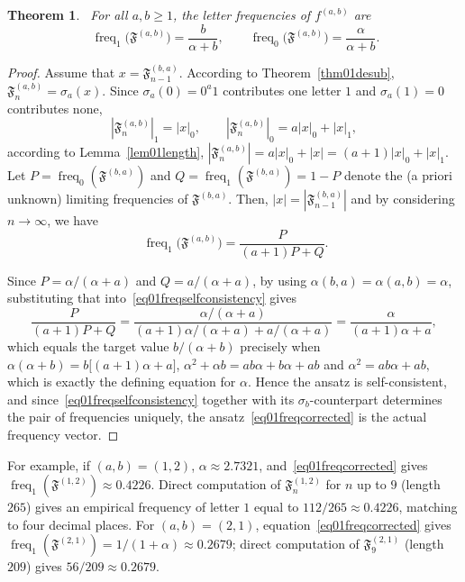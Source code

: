\documentclass[12pt]{amsart}
\theoremstyle{plain}
\newtheorem{theorem}{Theorem}[section]
\theoremstyle{definition}
\theoremstyle{remark}
\newcommand{\FD}{\mathfrak{F}}
\begin{document}
\begin{theorem}~\label{thm02freqduality}
For all $a,b\geqslant 1$, the letter frequencies of $f^{(a,b)}$ are
\begin{equation}~\label{eq01freqcorrected}
  \operatorname{freq}_1\bigl(\FD^{(a,b)}\bigr)=\frac{b}{\alpha+b},
  \qquad
  \operatorname{freq}_0\bigl(\FD^{(a,b)}\bigr)=\frac{\alpha}{\alpha+b}.
\end{equation}
\end{theorem}
\begin{proof}
Assume that  $x=\FD^{(b,a)}_{n-1}$. According to Theorem~\ref{thm01desub},
$\FD^{(a,b)}_n=\sigma_a(x)$. Since $\sigma_a(0)=0^a1$ contributes one
letter $1$ and $\sigma_a(1)=0$ contributes none, 
\[
  |\FD^{(a,b)}_n|_1=|x|_0, \qquad
  |\FD^{(a,b)}_n|_0=a|x|_0+|x|_1,
\]
according to Lemma~\ref{lem01length}, $|\FD^{(a,b)}_n|=a|x|_0+|x|=(a+1)|x|_0+|x|_1$. Let $P=\operatorname{freq}_0(\FD^{(b,a)})$ and
$Q=\operatorname{freq}_1(\FD^{(b,a)})=1-P$ denote the (a priori unknown)
limiting frequencies of $\FD^{(b,a)}$. Then, $|x|=|\FD^{(b,a)}_{n-1}|$ and by considering $n\to\infty$, we have 
\begin{equation}~\label{eq01freqselfconsistency}
  \operatorname{freq}_1\bigl(\FD^{(a,b)}\bigr)=\frac{P}{(a+1)P+Q}.
\end{equation}

Since $P=\alpha/(\alpha+a)$
and $Q=a/(\alpha+a)$, by using $\alpha(b,a)=\alpha(a,b)=\alpha$, substituting that
into~\eqref{eq01freqselfconsistency} gives
\[
  \frac{P}{(a+1)P+Q}
  = \frac{\alpha/(\alpha+a)}{(a+1)\alpha/(\alpha+a) + a/(\alpha+a)}
  = \frac{\alpha}{(a+1)\alpha+a},
\]
which equals the target value $b/(\alpha+b)$ precisely when $ \alpha(\alpha+b) = b\bigl[(a+1)\alpha+a\bigr]$, $\alpha^2+\alpha b = ab\alpha+b\alpha+ab$ and  $\alpha^2 = ab\alpha+ab,$
which is exactly the defining equation for $\alpha$. Hence the ansatz
is self-consistent, and since~\eqref{eq01freqselfconsistency} together
with its $\sigma_b$-counterpart determines the pair of frequencies
uniquely, the
ansatz~\eqref{eq01freqcorrected} is the actual frequency vector.
\end{proof}

For example, if  $(a,b)=(1,2)$, $\alpha\approx2.7321$, and~\eqref{eq01freqcorrected}
gives $\operatorname{freq}_1(\FD^{(1,2)})\approx0.4226$. Direct computation
of $\FD^{(1,2)}_n$ for $n$ up to $9$ (length $265$) gives an empirical
frequency of letter $1$ equal to $112/265\approx0.4226$, matching to
four decimal places. For $(a,b)=(2,1)$, equation~\eqref{eq01freqcorrected}
gives $\operatorname{freq}_1(\FD^{(2,1)})=1/(1+\alpha)\approx0.2679$;
direct computation of $\FD^{(2,1)}_9$ (length $209$) gives $56/209\approx0.2679$.
\end{document}
